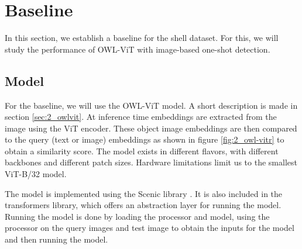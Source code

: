 \section{Baseline}
In this section, we establish a baseline for the shell dataset. For this, we will study the performance of OWL-ViT with image-based one-shot detection. 

\subsection{Model}
For the baseline, we will use the OWL-ViT model. A short description is made in section \ref*{sec:2_owlvit}. At inference time embeddings are extracted from the image using the ViT encoder. These object image embeddings are then compared to the query (text or image) embeddings as shown in figure \ref{fig:2_owl-vitr} to obtain a similarity score. The model exists in different flavors, with different backbones and different patch sizes. Hardware limitations limit us to the smallest ViT-B/32 model.

The model is implemented using the Scenic library \citep{scenic}. 
It is also included in the transformers library, which offers an abstraction layer for running the model. Running the model is done by loading the processor and model, using the processor on the query images and test image to obtain the inputs for the model and then running the model.

